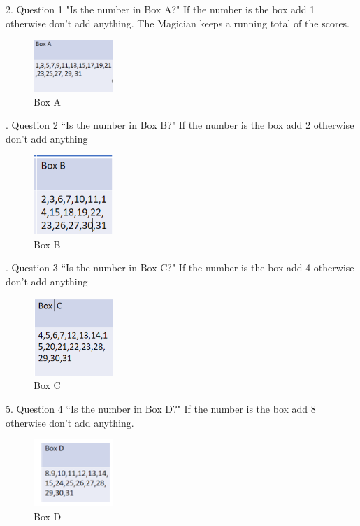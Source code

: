 2.	Question 1 "Is the number in Box A?" If the number is the box add 1 otherwise don't add anything. The Magician keeps a running total of the scores.
\newline
\begin{figure}
    \centering
    \includegraphics[width=3cm]{chapters/chapterCT1/boxA.png}
    \caption{Box A}
    \label{fig:Box A}
\end{figure}
.	Question 2 “Is the number in Box B?" If the number is the box add 2 otherwise don't add anything
\newline
\begin{figure}
    \centering
    \includegraphics[width=3cm]{chapters/chapterCT1/BoxB.png}
    \caption{Box B}
    \label{fig:Box B}
\end{figure}
.	Question 3 “Is the number in Box C?" If the number is the box add 4 otherwise don't add anything
\begin{figure}
    \centering
    \includegraphics[width=3cm]{chapters/chapterCT1/BoxC.png}
    \caption{Box C}
    \label{fig:Box C}
\end{figure}
5.	Question 4 “Is the number in Box D?" If the number is the box add 8 otherwise don't add anything.
\begin{figure}
    \centering
    \includegraphics[width=3cm]{chapters/chapterCT1/figures/boxD.png}
    \caption{Box D}
    \label{fig:Box D}
\end{figure}
